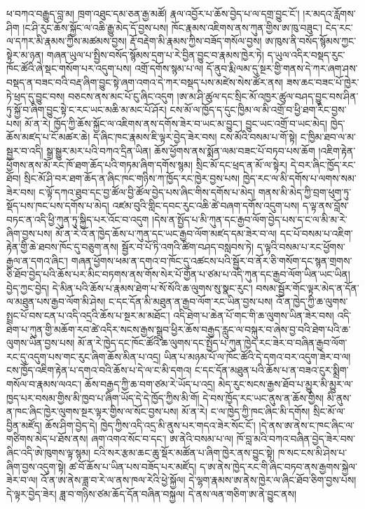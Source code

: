 \documentclass{article}
\begin{document}
ཕ་བཀའ་བརྒྱུད་བླ་མ། ཁྲག་འཐུང་དམ་ཅན་རྒྱ་མཚོ། རྣལ་འབྱོར་པ་ཆོས་བྱེད་པ་ལ་དགྲ་བྱུང་ངོ་། །ར་མདའ་རློགས་ཤིག །ང་ཤི་རུང་ཆོས་སྐྱོང་ལ་འཆི་རྒྱུ་མེད་དོ་བྱས་པས། ཁོང་རྣམས་འཇིགས་ནས་ཀུན་གྱིས་ཨ་ཁུ་བཟུང་། ངེད་རང་ལ་དཀར་མི་རྣམས་ཀྱིས་མཚམས་བྱས། རྡོ་བརྡེག་མི་རྣམས་ཀྱིས་བཟོད་གསོལ་བྱས། ཨ་ཁུས་ནི་བསོད་སྙོམས་ཀྱང་སྟེར་མ་ཉན། གཞན་ཡུལ་པ་སྤྱིས་བསོད་སྙོམས་དྲག་པ་རེ་བྱིན་བྱུང་བ་རྣམས་ཁྱེར་ཏེ། ད་ཡུལ་འདིར་བསྡད་རུང་ཁོང་ཚོའི་ཞེ་སྡང་གསོག་པར་འདུག་པས། འགྲོ་དགོས་སྙམ་པ་ལ། དོ་ནུབ་རྨི་ལམ་དུ་སྔར་གྱི་གནས་དེ་ཀར་ཞག་ཤས་བསྡད་ན་བཟང་བའི་བརྡ་ཞིག་བྱུང་སྟེ་ཞག་འགའ་དེ་ཀར་བསྡད་པས་མཛེས་སེས་ཚོར་ནས། ཟས་ཆང་བཟང་པོ་ཁྱེར་ཏེ་ཕྲད་དུ་བྱུང་བས། བཅངས་ནས་མང་པོ་ངུ་ཞིང་འདུག །ཨ་མ་ཤི་ཚུལ་དང་སྲིང་མོ་འཁྱར་ཚུལ་བཤད་བྱུང་བས་ཤིན་ཏུ་སྐྱོ་བ་ཞིག་བྱུང་སྟེ་ང་རང་ཡང་མཆི་མ་མང་པོ་ཤོར། ངས་མོ་ལ་ཁྱོད་ད་དུང་ཁྱིམ་ལ་མི་འགྲོ་བ་ཕྱི་ཐག་རིང་བྱས་པས། མོ་ན་རེ། ཁྱོད་ཀྱི་ཆོས་སྐྱོང་ལ་འཇིགས་ནས་དགོས་ཟེར་བ་ཡང་མ་བྱུང་། བྱུང་ཡང་འགྲོ་བ་ཡང་མེད། ཁྱེད་ཆོས་མཛད་པ་ངོ་མཚར་ཆེ། ད་ཞིང་ཁང་རྣམས་ཇི་ལྟར་བྱེད་ཟེར་བས། ངས་མོའི་བསམ་པ་གོ་སྟེ། ང་ཁྱིམ་ཐབ་ལ་མ་སྦྱར་བ་འདི། སྒྲ་སྒྱུར་མར་པའི་བཀའ་དྲིན་ཡིན། ཆོས་ཕྱོགས་ནས་སྨོན་ལམ་བཟང་པོ་བཏབ་པས་ཆོག །འཇིག་རྟེན་ཕྱོགས་ནས་མོ་རང་ཁོ་ཐག་ཆོད་པའི་གཏམ་ཞིག་དགོས་སྙམ། སྲིང་མོ་དང་ཕྲད་ན་མོ་ལ་སྟེར། དེ་བར་ཞིང་ཁྱོད་རང་ཐོབ། སྲིང་མོ་ཤི་བར་ཐག་ཆོད་ན་ཞིང་ཁང་གཉིས་ཀ་ཁྱོད་རང་ཁྱེར་བྱས་པས། ཁྱེད་རང་ལ་མི་དགོས་པ་ལགས་སམ་ཟེར་བས། ང་ལྟོ་དཀའ་ཐུབ་དང་བྱ་ཚོལ་བྱི་ཚོལ་བྱེད་པས་ཞིང་གིས་དགོས་པ་མེད། གནས་མི་མེད་ཀྱི་བྲག་ཕུག་ཏུ་སྡོད་པས་ཁང་པས་དགོས་པ་མེད། འཛམ་བུའི་གླིང་དབང་རུང་འཆི་ཚེ་བཞག་དགོས་འདུག་པས། ད་ལྟ་ནས་བློས་བཏང་ན་འདི་ཕྱི་ཀུན་ཏུ་སྐྱིད་པར་འོང་བ་འདུག །དེས་ན་སྤྱོད་པ་མི་ཀུན་དང་རྒྱབ་ལོག་བྱེད་པས་ད་ང་ལ་མི་མ་རེ་ཞིག་བྱས་པས། མོ་ན་རེ་འོ་ན་ཁྱེད་ཆོས་པ་ཀུན་དང་ཡང་རྒྱབ་ལོག་མཛད་དམ་ཟེར་བ་ལ། དང་པོ་བསམ་པ་འཇིག་རྟེན་གྱི་ཆེ་ཐབས་ཁོང་དུ་བཅུག་ནས། སྦྱོར་བ་པོ་ཏི་འགའི་ཚིག་བཤད་བསླབས་ཏེ། ད་ལྟའི་བསམ་པ་རང་ཕྱོགས་རྒྱལ་ན་དགའ་ཞིང་། གཞན་ཕྱོགས་ཕམ་ན་དགའ་བ་ཁོང་དུ་འཚངས་པའི་སྦྱོར་བ་ནོར་ཅི་གསོག་དང་སྙན་གྲགས་ཅི་ཐོབ་བྱེད་པའི་ཆོས་པར་མིང་བཏགས་ནས་གོས་སེར་པོ་གྱོན་པ་ཙམ་པ་འདི་ཀུན་དང་རྒྱབ་ལོག་ཡིན་ཡང་ཡིན། བྱེད་ཀྱང་བྱེད། དེ་མིན་པའི་ཆོས་པ་རྣམས་ཐེག་པ་སོ་སོའི་ཆ་ལུགས་སུ་སྣང་རུང་། བསམ་སྦྱོར་གོང་ལྟར་མེད་ན་དོན་ལ་མཐུན་པས་རྒྱབ་ལོག་མི་ཤེས། ང་དང་དོན་མི་མཐུན་ན་རྒྱབ་ལོག་རང་ཡིན་བྱས་པས། འོ་ན་ཁྱེད་ཀྱི་ཆ་ལུགས་སྤྲང་པོ་བས་ངན་པ་འདི་འདྲའི་ཆོས་པ་སྔར་མ་མཐོང་། འདི་ཐེག་པ་ཆེན་པོ་གང་གི་ཆ་ལུགས་ཡིན་ཟེར་བས། འདི་ཐེག་པ་ཀུན་གྱི་མཆོག་རབ་ཚེ་འདིར་སངས་རྒྱས་སྒྲུབ་ཕྱིར་ཆོས་བརྒྱད་རླུང་ལ་བསྐུར་བ་ཞེས་བྱ་བའི་ཐེག་པའི་ཆ་ལུགས་ཡིན་བྱས་པས། མོ་ན་རེ་ཁྱེད་དང་ཁོང་ཚོའི་ཆ་ལུགས་དང་སྤྱོད་པ་ཀུན་ཁྱེད་རང་ཟེར་བ་བཞིན་རྒྱབ་ལོག་རང་དུ་འདུག་པས་གང་རུང་ཞིག་ཆོས་མིན་པ་འདྲ། ཡིན་པ་མཉམ་པོ་ལ་ཁོང་ཚོའི་དེ་དགའ་བར་འདུག་ཟེར་བ་ལ། ངས་ཁྱོད་འཇིག་རྟེན་པ་དགའ་བའི་ཆོས་པ་དེ་ལ་ང་མི་དགའ། ང་དང་དོན་མཐུན་པའི་ཆོས་པ་ན་བཟའ་ངུར་སྨྲིག་གསོལ་བ་རྣམས་ལའང་། ཆོས་བརྒྱད་ཀྱི་ཆ་བག་ཙམ་རེ་ཡོད་པ་འདྲ། མེད་རུང་སངས་རྒྱས་ཐོབ་པ་མྱུར་མི་མྱུར་ལ་ཁྱད་པར་བསམ་གྱིས་མི་ཁྱབ་པ་ཞིག་ཡོད་དེ་དེ་ཁྱོད་ཀྱིས་མི་གོ། དེ་བས་ཁྱོད་རང་ཡང་ནུས་ན་ཆོས་གྱིས། མི་ནུས་ན་ཁང་ཞིང་ཁྱེར་ལུགས་སྔར་ལྟར་གྱིས་ལ་སོང་བྱས་པས། མོ་ན་རེ། ང་ལ་ཁྱེད་ཀྱི་ཁང་ཞིང་མི་དགོས། སྲིང་མོ་ལ་བྱིན་མཛོད། ཆོས་ཤིག་བྱེད་དེ། ཁྱེད་ཀྱིས་འདི་འདྲ་མི་ནུས་པར་གདའ་ཟེར་སོང་ངོ་། །དེ་ནས་ཨ་ནེས་ང་ཁང་ཞིང་ལ་གཙིགས་མེད་པ་ཐོས་ནས། ཞག་འགའ་སོང་བ་དང་། ཨ་ནེའི་བསམ་པ་ལ། ཁོ་བླ་མའི་བཀའ་བཞིན་བྱེད་ཟེར་བས་ཞིང་འདི་ཨེ་ཁུགས་ལྟ་སྙམ། ངའི་སར་རྩམ་ཆང་ཆུ་སྡོར་མཚོན་པ་ཞིག་ཁྱེར་ནས་བྱུང་སྟེ། ཁ་སང་ངས་མི་ཤེས་པ་ཞིག་བྱས་འདུག་སྟེ། ཚ་བོ་ཆོས་པ་ཡིན་པས་བཟོད་པར་མཛོད། ད་ཨ་ནེས་ཁྱེད་རང་གི་ཞིང་བཏབ་ནས་རྒྱགས་སྐྱེལ་ཟེར་བ་ལ། འོ་ན་ཨ་ནེས་ཟླ་བ་རེ་ལ་ནས་ཁལ་རེའི་ཕྱེ་སྐྱོལ། དེ་ལྷག་རྣམས་ཨ་ནེས་ཁྱེར་ལ་ཞིང་ཐོབ་ཅིག་བྱས་པས། དེ་ལྟར་བྱེད་ཟེར། ཟླ་བ་གཉིས་ཙམ་ཆོད་དོན་བཞིན་བསྐྱལ། དེ་ནས་ལན་གཅིག་ཨ་ནེ་བྱུང་ནས། 
\end{document}
